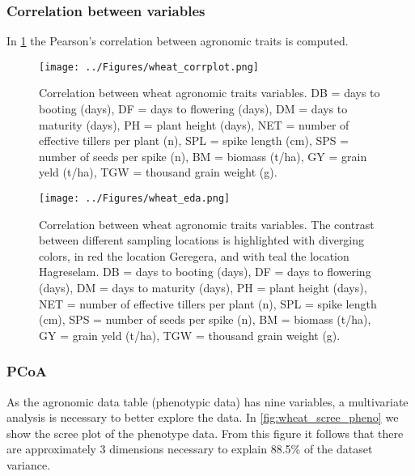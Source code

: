 \documentclass[a4paper,onecolumn,10pt]{article}
\begin{document}
\subsubsection{Correlation between variables}

In \cref{fig:wheat_corr} the Pearson's correlation between agronomic traits is computed.

\begin{figure}[H]
    \centering
    \texttt{[image: ../Figures/wheat\_corrplot.png]}
    \caption{
        Correlation between wheat agronomic traits variables.
        DB = days to booting (days),
        DF = days to flowering (days),
        DM = days to maturity (days),
        PH = plant height (days),
        NET = number of effective tillers per plant (n),
        SPL = spike length (cm),
        SPS = number of seeds per spike (n),
        BM = biomass (t/ha),
        GY = grain yeld (t/ha),
        TGW = thousand grain weight (g).
    }
    \label{fig:wheat_corr}
\end{figure}


\begin{figure}[H]
    \centering
    \texttt{[image: ../Figures/wheat\_eda.png]}
    \caption{
        Correlation between wheat agronomic traits variables.
        The contrast between different sampling locations is highlighted with diverging colors, in red the location Geregera, and with teal the location Hagreselam.
        DB = days to booting (days),
        DF = days to flowering (days),
        DM = days to maturity (days),
        PH = plant height (days),
        NET = number of effective tillers per plant (n),
        SPL = spike length (cm),
        SPS = number of seeds per spike (n),
        BM = biomass (t/ha),
        GY = grain yeld (t/ha),
        TGW = thousand grain weight (g).
    }
    \label{fig:wheat_eda}
\end{figure}


\subsubsection{PCoA}

As the agronomic data table (phenotypic data) has nine variables, a multivariate analysis is necessary to better explore the data.
In \cref{fig:wheat_scree_pheno} we show the scree plot of the phenotype data.
From this figure it follows that there are approximately 3 dimensions necessary to explain 88.5\% of the dataset variance.
\end{document}
